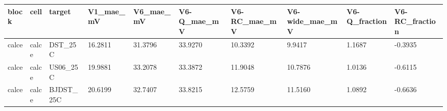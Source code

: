 \begin{tabular}{llllllllll}
\hline
block & cell & target & V1\_mae\_mV & V6\_mae\_mV & V6-Q\_mae\_mV & V6-RC\_mae\_mV & V6-wide\_mae\_mV & V6-Q\_fraction & V6-RC\_fraction \\
\hline
calce & calce & DST\_25C & 16.2811 & 31.3796 & 33.9270 & 10.3392 & 9.9417 & 1.1687 & -0.3935 \\
calce & calce & US06\_25C & 19.9881 & 33.2078 & 33.3872 & 11.9048 & 10.7876 & 1.0136 & -0.6115 \\
calce & calce & BJDST\_25C & 20.6199 & 32.7407 & 33.8215 & 12.5759 & 11.5160 & 1.0892 & -0.6636 \\
\hline
\end{tabular}
